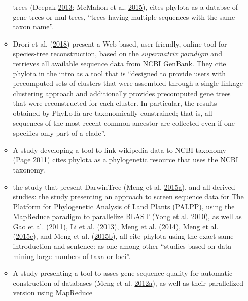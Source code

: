 \documentclass[]{article}
\begin{document}
\begin{enumerate}
\begin{itemize}
    trees (Deepak \protect\hyperlink{ref-deepak2013managing}{2013}; McMahon et al. \protect\hyperlink{ref-mcmahon2015stbase}{2015}), cites phylota as a databse of gene trees or mul-trees,
    ``trees having multiple sequences with the same taxon name''.
  \item
    Drori et al. (\protect\hyperlink{ref-drori2018onetwotree}{2018}) present a Web‐based, user-friendly, online tool for species-tree
    reconstruction, based on the \emph{supermatrix paradigm} and retrieves all available
    sequence data from NCBI GenBank. They cite phylota in the intro as a tool that is ``designed to provide
    users with precomputed sets of clusters that were assembled through a single‐linkage
    clustering approach and additionally provides precomputed gene trees that were
    reconstructed for each cluster. In particular, the results obtained by PhyLoTa
    are taxonomically constrained; that is, all sequences of the most recent common
    ancestor are collected even if one specifies only part of a clade''.
  \item
    A study developing a tool to link wikipedia data to NCBI taxonomy (Page \protect\hyperlink{ref-page2011linking}{2011})
    cites phylota as a phylogenetic resource that uses the NCBI taxonomy.
  \item
    the study that present DarwinTree (Meng et al. \protect\hyperlink{ref-meng2015darwintree}{2015}\protect\hyperlink{ref-meng2015darwintree}{a}), and all derived studies: the study
    presenting an approach to screen sequence data for The Platform
    for Phylogenetic Analysis of Land Plants (PALPP), using the MapReduce paradigm
    to parallelize BLAST (Yong et al. \protect\hyperlink{ref-yong2010screening}{2010}), as well as Gao et al. (\protect\hyperlink{ref-gao2011solution}{2011}), Li et al. (\protect\hyperlink{ref-li2013partfasttree}{2013}),
    Meng et al. (\protect\hyperlink{ref-meng2014rapidtree}{2014}), Meng et al. (\protect\hyperlink{ref-meng2015sotree}{2015}\protect\hyperlink{ref-meng2015sotree}{c}), and Meng et al. (\protect\hyperlink{ref-meng2015solution}{2015}\protect\hyperlink{ref-meng2015solution}{b}), all cite phylota using the exact same
    introduction and sentence: as one among other ``studies based on data mining large numbers of taxa or loci''.
  \item
    A study presenting a tool to asses gene sequence quality for automatic
    construction of databases (Meng et al. \protect\hyperlink{ref-meng2012gsqct}{2012}\protect\hyperlink{ref-meng2012gsqct}{a}), as well as their parallelized version using MapReduce

\end{itemize}
\end{enumerate}
\end{document}
